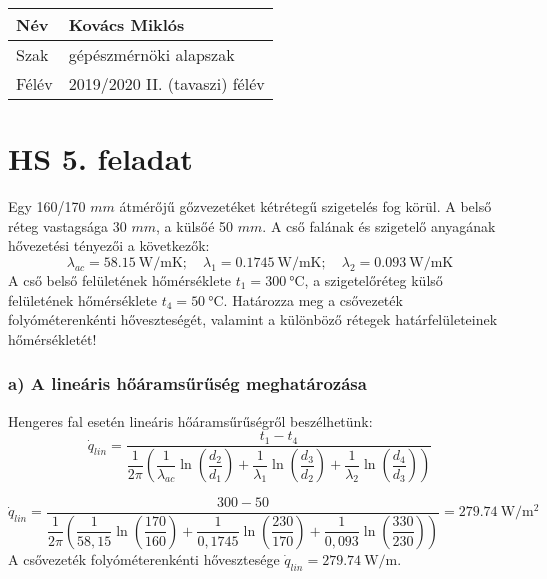 \begin{tabular}{ | p{2cm} | p{13cm} | } 
	\hline
	Név & Kovács Miklós \\ 
	\hline
	Szak & gépészmérnöki alapszak \\ 
	\hline
	Félév & 2019/2020 II. (tavaszi) félév \\ 
	\hline
\end{tabular}

\section*{HS 5. feladat} 

Egy 160/170 $mm$ átmérőjű gőzvezetéket kétrétegű szigetelés fog körül. A belső réteg vastagsága 30 $mm$, a külsőé 50 $mm$. A cső falának és szigetelő anyagának hővezetési tényezői a következők:
\begin{equation*}
	\lambda_{ac} = \SI{58,15}{\watt\per\meter\kelvin};
	\quad
	\lambda_1 = \SI{0,1745}{\watt\per\meter\kelvin};
	\quad
	\lambda_2 = \SI{0,093}{\watt\per\meter\kelvin}
\end{equation*}
A cső belső felületének hőmérséklete $t_1 =\SI{300}{\celsius}$, a szigetelőréteg külső felületének hőmérséklete $t_4 =\SI{50}{\celsius}$. Határozza meg a csővezeték folyóméterenkénti hőveszteségét, valamint a különböző rétegek határfelületeinek hőmérsékletét!

\subsubsection*{a) A lineáris hőáramsűrűség meghatározása }
Hengeres fal esetén lineáris hőáramsűrűségről beszélhetünk:
\begin{equation*}
 \dot{q}_{lin} = \dfrac {t_1 - t_4}{\dfrac{1}{2 \pi} \left(\dfrac {1}{\lambda_{ac}} \ln ( \dfrac {d_2}{d_1})+\dfrac {1}{\lambda_{1}} \ln ( \dfrac {d_3}{d_2})+\dfrac {1}{\lambda_{2}} \ln ( \dfrac {d_4}{d_3})\right)} 
\end{equation*}

\begin{equation}
\dot{q}_{lin} = \dfrac {300 - 50}{\dfrac{1}{2 \pi} \left(\dfrac {1}{58,15} \ln ( \dfrac {170}{160})+\dfrac {1}{0,1745} \ln ( \dfrac {230}{170})+\dfrac {1}{0,093} \ln ( \dfrac {330}{230})\right)} =\SI{279,74}{\watt\per\meter\squared}
\end{equation}
A csővezeték folyóméterenkénti hővesztesége $\dot{q}_{lin} = \SI{279,74}{\watt\per\meter}$.



